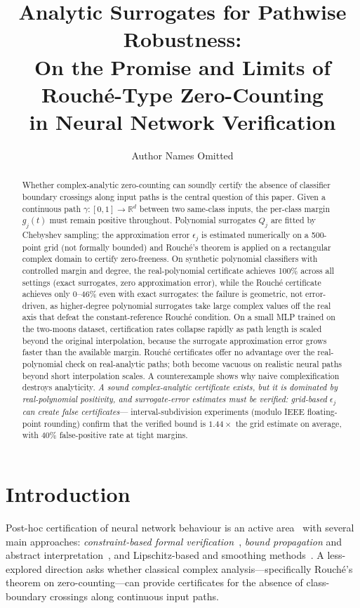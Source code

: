 \documentclass{article}
\title{Analytic Surrogates for Pathwise Robustness:\\
On the Promise and Limits of Rouch\'e-Type Zero-Counting\\
in Neural Network Verification}
\author{Author Names Omitted}
\date{}
\theoremstyle{definition}
\begin{document}
\maketitle

\begin{abstract}
Whether complex-analytic zero-counting can soundly certify the absence of
classifier boundary crossings along input paths is the central question of
this paper.  Given a continuous path $\gamma:[0,1]\to\mathbb{R}^d$ between
two same-class inputs, the per-class margin $g_j(t)$ must remain positive
throughout.  Polynomial surrogates $Q_j$ are fitted by Chebyshev sampling;
the approximation error $\epsilon_j$ is estimated numerically on a
500-point grid (not formally bounded) and Rouch\'e's theorem is
applied on a rectangular complex domain to certify zero-freeness.
On synthetic polynomial classifiers with controlled margin and degree, the
real-polynomial certificate achieves 100\% across all settings (exact
surrogates, zero approximation error), while the Rouch\'e certificate achieves
only 0--46\% even with exact surrogates: the failure is geometric, not
error-driven, as higher-degree polynomial surrogates take large complex values
off the real axis that defeat the constant-reference Rouch\'e condition.
On a small MLP trained on the two-moons dataset, certification rates collapse
rapidly as path length is scaled beyond the original interpolation, because
the surrogate approximation error grows faster than the available margin.
Rouch\'e certificates offer no advantage over the real-polynomial check on
real-analytic paths; both become vacuous on realistic neural paths beyond
short interpolation scales.  A counterexample shows why naive complexification
destroys analyticity.  \emph{A sound complex-analytic certificate exists, but
it is dominated by real-polynomial positivity, and surrogate-error estimates
must be verified: grid-based $\epsilon_j$ can create false certificates}---
interval-subdivision experiments (modulo IEEE floating-point rounding) confirm
that the verified bound is $1.44\times$ the grid estimate on average, with $40\%$
false-positive rate at tight margins.
\end{abstract}

\section{Introduction}
\label{sec:intro}

Post-hoc certification of neural network behaviour is an active
area~\cite{liu2021algorithms} with several main approaches:
\emph{constraint-based formal verification}~\cite{katz2017reluplex},
\emph{bound propagation} and abstract
interpretation~\cite{singh2019abstract}, and Lipschitz-based and
smoothing methods~\cite{weng2018evaluating,cohen2019certified}.
A less-explored direction asks whether classical complex
analysis---specifically Rouch\'e's theorem on zero-counting---can
provide certificates for the absence of class-boundary crossings along
continuous input paths.
\end{document}
